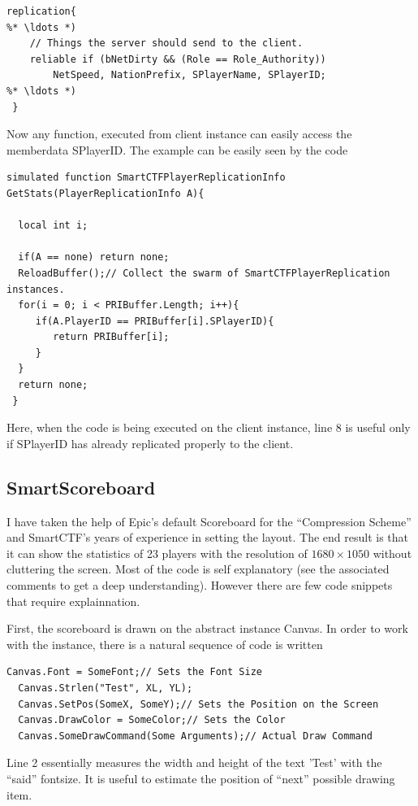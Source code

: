 \documentclass{article}
\begin{document}
\begin{lstlisting}[frame=single]
  replication{
%* \ldots *) 
    // Things the server should send to the client.
	reliable if (bNetDirty && (Role == Role_Authority))
		NetSpeed, NationPrefix, SPlayerName, SPlayerID;
%* \ldots *) 
 }
\end{lstlisting}
Now any function, executed from client instance can easily access the memberdata {\color{Magenta}SPlayerID}.  The example can be easily seen by the code
\begin{lstlisting}[frame=single]
 simulated function SmartCTFPlayerReplicationInfo GetStats(PlayerReplicationInfo A){

  local int i;

  if(A == none) return none;
  ReloadBuffer();// Collect the swarm of SmartCTFPlayerReplication instances.
  for(i = 0; i < PRIBuffer.Length; i++){
     if(A.PlayerID == PRIBuffer[i].SPlayerID){
        return PRIBuffer[i];
     }
  }
  return none;
 }
\end{lstlisting}
Here, when the code is being executed on the client instance, line 8 is useful only if {\color{Magenta}SPlayerID} has already replicated properly to the client.

\subsection{SmartScoreboard}
\label{sec:smartscoreboard}
I have taken the help of Epic's default Scoreboard for the ``Compression Scheme'' and SmartCTF's years of experience in setting the layout.  The end result is that it can show the statistics of 23 players with the resolution of $1680 \times 1050$ without cluttering the screen.  Most of the code is self explanatory (see the associated comments to get a deep understanding).  However there are few code snippets that require explainnation.

First, the scoreboard is drawn on the abstract instance {\color{Purple}Canvas}.  In order to work with the instance, there is a natural sequence of code is written

\begin{lstlisting}[frame=single]
  Canvas.Font = SomeFont;// Sets the Font Size
  Canvas.Strlen("Test", XL, YL);
  Canvas.SetPos(SomeX, SomeY);// Sets the Position on the Screen
  Canvas.DrawColor = SomeColor;// Sets the Color
  Canvas.SomeDrawCommand(Some Arguments);// Actual Draw Command
\end{lstlisting}

Line 2 essentially measures the width and height of the text 'Test' with the ``said'' fontsize.  It is useful to estimate the position of ``next'' possible drawing item.
\end{document}
